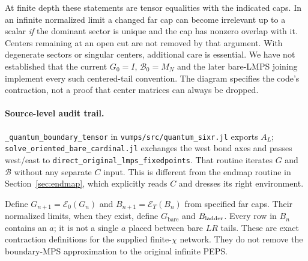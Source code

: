 \documentclass[11pt]{article}
\newcommand{\Gz}{G_{\mathrm{bare}}}
\newcommand{\code}[1]{{\small\nolinkurl{#1}}}
\begin{document}
At finite depth these statements are tensor equalities with the indicated
caps. In an infinite normalized limit a changed far cap can become irrelevant
up to a scalar \emph{if} the dominant sector is unique and the cap has nonzero
overlap with it. Centers remaining at an open cut are not removed by that
argument. With degenerate sectors or singular centers, additional care is
essential. We have not established that the current $G_0=I$,
$\mathcal B_0=M_N$ and the later bare-LMPS joining implement every such
centered-tail convention. The diagram specifies the code's contraction,
not a proof that center matrices can always be dropped.

\paragraph{Source-level audit trail.}
\code{_quantum_boundary_tensor} in \code{vumps/src/quantum_sixr.jl}
exports $A_L$; \code{solve_oriented_bare_cardinal.jl} exchanges the west
bond axes and passes west/east to \code{direct_original_lmps_fixedpoints}.
That routine iterates $G$ and $\mathcal B$ without any separate $C$ input.
This is different from the endmap routine in Section~\ref{sec:endmap}, which
explicitly reads $C$ and dresses its right environment.
\fi

\begin{center}
\end{center}
Define $G_{n+1}=\mathcal E_0(G_n)$ and $B_{n+1}=\mathcal E_T(B_n)$ from specified
far caps. Their normalized limits, when they exist, define $\Gz$ and
$B_{\rm ladder}$. Every row in $B_n$ contains an $a$; it is not a single $a$
placed between bare $LR$ tails. These are exact contraction definitions for
the supplied finite-$\chi$ network. They do not remove the boundary-MPS
approximation to the original infinite PEPS.
\end{document}
